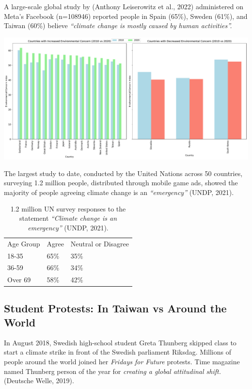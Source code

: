 \documentclass[
  letterpaper,
  DIV=11,
  numbers=noendperiod]{scrartcl}
\begin{document}
A large-scale global study by (Anthony Leiserowitz et al., 2022)
administered on Meta's Facebook (n=108946) reported people in Spain
(65\%), Sweden (61\%), and Taiwan (60\%) believe \emph{``climate change
is mostly caused by human activities''.}

\includegraphics{_thesis_files/figure-pdf/cell-6-output-1.pdf}

The largest study to date, conducted by the United Nations across 50
countries, surveying 1.2 million people, distributed through mobile game
ads, showed the majority of people agreeing climate change is an
\emph{``emergency''} (UNDP, 2021).

\begin{longtable}[]{@{}lll@{}}
\caption{1.2 million UN survey responses to the statement
\emph{``Climate change is an emergency''} (UNDP, 2021).}\tabularnewline
\toprule\noalign{}
\endfirsthead
\endhead
\bottomrule\noalign{}
\endlastfoot
Age Group & Agree & Neutral or Disagree \\
18-35 & 65\% & 35\% \\
36-59 & 66\% & 34\% \\
Over 69 & 58\% & 42\% \\
\end{longtable}

\subsection{Student Protests: In Taiwan vs Around the
World}\label{student-protests-in-taiwan-vs-around-the-world}

In August 2018, Swedish high-school student Greta Thunberg skipped class
to start a climate strike in front of the Swedish parliament Riksdag.
Millions of people around the world joined her \emph{Fridays for Future}
protests. Time magazine named Thunberg person of the year for
\emph{creating a global attitudinal shift.} (Deutsche Welle, 2019).
\end{document}
